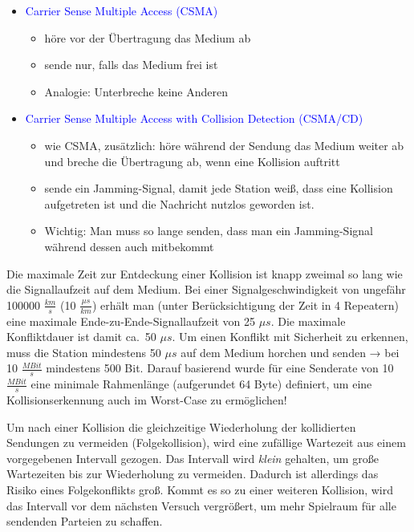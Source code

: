 \begin{itemize}
    \item \textcolor{blue}{Carrier Sense Multiple Access (CSMA)}
    \begin{itemize}
        \item höre vor der Übertragung das Medium ab
        \item sende nur, falls das Medium frei ist
        \item Analogie: Unterbreche keine Anderen
    \end{itemize}
    \item \textcolor{blue}{Carrier Sense Multiple Access with Collision Detection (CSMA/CD)}
    \begin{itemize}
        \item wie CSMA, zusätzlich: höre während der Sendung das Medium weiter ab und breche die Übertragung ab, wenn eine Kollision auftritt
        \item sende ein Jamming-Signal, damit jede Station weiß, dass eine Kollision aufgetreten ist und die Nachricht nutzlos geworden ist.
        \item Wichtig: Man muss so lange senden, dass man ein Jamming-Signal während dessen auch mitbekommt
    \end{itemize}
\end{itemize}

Die maximale Zeit zur Entdeckung einer Kollision ist knapp zweimal so lang wie die Signallaufzeit auf dem Medium.
Bei einer Signalgeschwindigkeit von ungefähr 100000 $\frac{km}{s}$ (10 $\frac{\mu s}{km}$) erhält man (unter Berücksichtigung der Zeit in 4 Repeatern) eine maximale Ende-zu-Ende-Signallaufzeit von 25 $\mu s$.
Die maximale Konfliktdauer ist damit ca.\ 50 $\mu s$.
Um einen Konflikt mit Sicherheit zu erkennen, muss die Station mindestens 50 $\mu s$ auf dem Medium horchen und senden → bei 10 $\frac{MBit}{s}$ mindestens 500 Bit.
Darauf basierend wurde für eine Senderate von 10 $\frac{MBit}{s}$ eine minimale Rahmenlänge (aufgerundet 64 Byte) definiert, um eine Kollisionserkennung auch im Worst-Case zu ermöglichen!

Um nach einer Kollision die gleichzeitige Wiederholung der kollidierten Sendungen zu vermeiden (Folgekollision),
wird eine zufällige Wartezeit aus einem vorgegebenen Intervall gezogen.
Das Intervall wird \textit{klein} gehalten, um große Wartezeiten bis zur Wiederholung zu vermeiden.
Dadurch ist allerdings das Risiko eines Folgekonflikts groß.
Kommt es so zu einer weiteren Kollision, wird das Intervall vor dem nächsten Versuch vergrößert,
um mehr Spielraum für alle sendenden Parteien zu schaffen.

